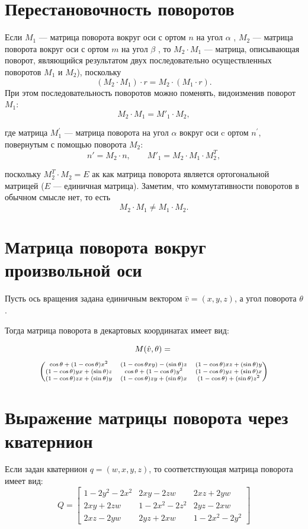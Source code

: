\documentclass{book}
\begin{document}
\section*{Перестановочность поворотов}
Если $M_{1}$ — матрица поворота вокруг оси с ортом $n$ на угол $\alpha$ , $M_{2}$ --- матрица поворота вокруг оси с ортом $m$ на угол $\beta$ , то $M_{2}\cdot M_{1}$ — матрица, описывающая поворот, являющийся результатом двух последовательно осуществленных поворотов $M_{1}$ и $M_{2}$), поскольку
$$(M_{2}\cdot M_{1})\cdot r=M_{2}\cdot (M_{1}\cdot r).$$
При этом последовательность поворотов можно поменять, видоизменив поворот $M_{1}$:
$$M_{2}\cdot M_{1}=M'_{1}\cdot M_{2},$$

где матрица $M^{'}_{1}$ — матрица поворота на угол $\alpha$  вокруг оси c ортом $n^{'}$, повернутым с помощью поворота $M_{2}$:
$$n'=M_{2}\cdot n,\qquad M'_{1}=M_{2}\cdot M_{1}\cdot M_{2}^{T},$$

поскольку $M_{2}^{T}\cdot M_{2}=E$  ак как матрица поворота является ортогональной матрицей ($E$ — единичная матрица). Заметим, что коммутативности поворотов в обычном смысле нет, то есть
$$M_{2}\cdot M_{1}\neq M_{1}\cdot M_{2}.$$

\sloppypar \section*{ Матрица поворота вокруг произвольной оси}

Пусть ось вращения задана единичным вектором $\hat{v}=(x,y,z)$, а угол поворота $\theta$ .

Тогда матрица поворота в декартовых координатах имеет вид:

$$M(\hat{v},\theta)=\\$$
$$
\scriptsize{\begin{pmatrix}
   \cos{\theta}+(1-\cos{\theta})x^{2} & (1-\cos{\theta}xy)-(\sin{\theta})z & (1-\cos{\theta})xz+(\sin{\theta})y  \\
   (1-\cos{\theta})yx+(\sin{\theta})z & \cos{\theta}+(1-\cos{\theta})y^{2} & (1-\cos{\theta})yz+(\sin{\theta})x \\
     (1-\cos{\theta})zx+(\sin{\theta})y &
     (1-\cos{\theta})zy+(\sin{\theta})x & (1-\cos{\theta})+(\sin{\theta})z^{2}
\end{pmatrix}}
$$
\section*{Выражение матрицы поворота через кватернион}
Если задан кватернион $q=(w,x,y,z)$, то соответствующая матрица поворота имеет вид:
$$
Q=\begin{bmatrix}
1-2y^{2}-2x^{2}& 2xy-2zw & 2xz+2yw\\
2xy+2zw & 1-2x^{2}-2z^{2} & 2yz - 2xw\\
2xz-2yw & 2yz+2xw & 1-2x^{2}-2y^{2}
\end{bmatrix}
$$
\end{document}
